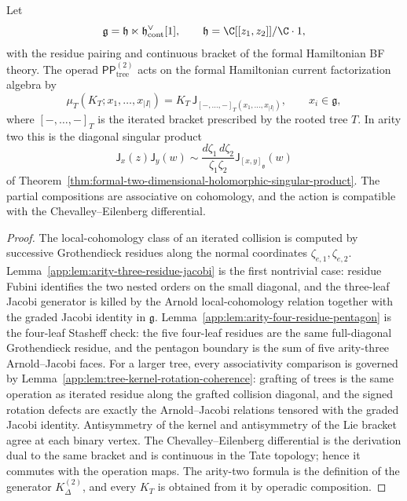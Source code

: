 \begin{thm}
\label{app:thm:formal-polydisk-all-arity-current-operad}
Let
\[
  \mathfrak g=\mathfrak h\ltimes\mathfrak h^\vee_{\mathrm{cont}}[1],
  \qquad
  \mathfrak h=\C[[z_1,z_2]]/\C\cdot1,
\]
with the residue pairing and continuous bracket of the formal
Hamiltonian BF theory.  The operad
\(\mathsf{PP}^{(2)}_{\mathrm{tree}}\) acts on the formal Hamiltonian
current factorization algebra by
\[
  \mu_T(K_T;x_1,\ldots,x_{|I|})
  =
  K_T\,\mathsf{J}_{[-,\ldots,-]_T(x_1,\ldots,x_{|I|})},
  \qquad x_i\in\mathfrak g,
\]
where \([-,\ldots,-]_T\) is the iterated bracket prescribed by the
rooted tree \(T\).  In arity two this is the diagonal singular product
\[
  \mathsf{J}_x(z)\mathsf{J}_y(w)
  \sim
  \frac{d\zeta_1\,d\zeta_2}{\zeta_1\zeta_2}
  \mathsf{J}_{[x,y]_{\mathfrak g}}(w)
\]
of Theorem~\ref{thm:formal-two-dimensional-holomorphic-singular-product}.  The
partial compositions are associative on cohomology, and the action is
compatible with the Chevalley--Eilenberg differential.
\end{thm}

\begin{proof}
The local-cohomology class of an iterated collision is computed by
successive Grothendieck residues along the normal coordinates
\(\zeta_{e,1},\zeta_{e,2}\).  Lemma~\ref{app:lem:arity-three-residue-jacobi}
is the first nontrivial case: residue Fubini identifies the two nested
orders on the small diagonal, and the three-leaf Jacobi generator is
killed by the Arnold local-cohomology relation together with the graded
Jacobi identity in \(\mathfrak g\).
Lemma~\ref{app:lem:arity-four-residue-pentagon} is the four-leaf
Stasheff check: the five four-leaf residues are the same
full-diagonal Grothendieck residue, and the pentagon boundary is the
sum of five arity-three Arnold--Jacobi faces.  For a larger tree, every
associativity comparison is governed by
Lemma~\ref{app:lem:tree-kernel-rotation-coherence}: grafting of trees
is the same operation as iterated residue along the grafted collision
diagonal, and the signed rotation defects are exactly the
Arnold--Jacobi relations tensored with the graded Jacobi identity.
Antisymmetry of the kernel and antisymmetry of the Lie bracket agree at
each binary vertex.  The Chevalley--Eilenberg
differential is the derivation dual to the same bracket and is
continuous in the Tate topology; hence it commutes with the operation
maps.  The arity-two formula is the definition of the generator
\(K^{(2)}_\Delta\), and every \(K_T\) is obtained from it by operadic
composition.
\end{proof}

